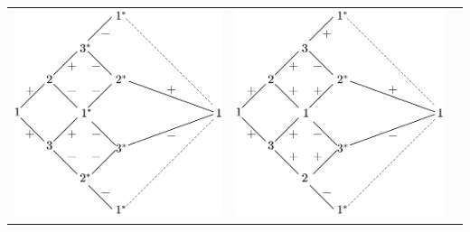 \documentclass[a4paper]{book}
\newcounter{solution}[chapter]
\begin{document}
\begin{solution}
\begin{itemize}
	\begin{center}
	\begin{tabular}{ccc}
	
		\begin{minipage}{0.3\linewidth}
		\centering
		\includegraphics[scale=0.5,trim=0 -8 0 -8]{./pictures/6.07/pictorial_representation_1.png}
		\end{minipage} &
		
		\begin{minipage}{0.3\linewidth}
		\centering
		\includegraphics[scale=0.5,trim=0 -8 0 -8]{./pictures/6.07/pictorial_representation_2.png}
		\end{minipage} &
		

\end{tabular}
\end{center}
\end{itemize}
\end{solution}
\end{document}
